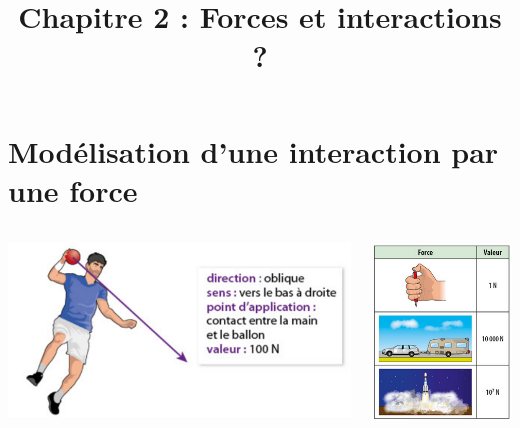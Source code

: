 \documentclass[xcolor={dvipsnames}]{beamer}
\title{Chapitre 2 : Forces et interactions ?}
\begin{document}
\begin{frame}
  \titlepage 
\end{frame}

\section{Modélisation d'une interaction par une force}


\begin{frame}

\end{frame}

\begin{frame}
%
%
	\begin{columns}
		\begin{column}{0.6\textwidth}
			\begin{center}
				\includegraphics[scale=0.5]{ex_force}
			\end{center}
		\end{column}
		\begin{column}{0.4\textwidth}
			\begin{center}
				\includegraphics[scale=0.5]{og_valeurs}
			\end{center}
		\end{column}
	\end{columns}
%
\end{frame}
\end{document}
